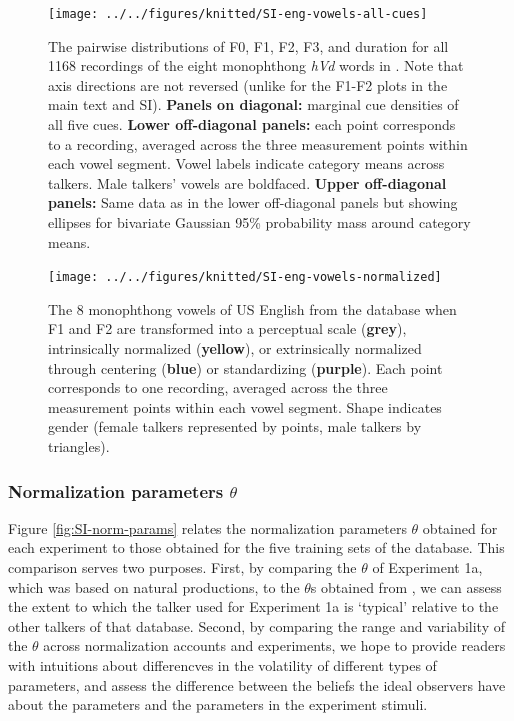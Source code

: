 \documentclass[preprint]{JASA}
\begin{document}
\begin{figure}[!ht]

{\centering \texttt{[image: ../../figures/knitted/SI-eng-vowels-all-cues]} 

}

\caption{The pairwise distributions of F0, F1, F2, F3, and duration for all 1168 recordings of the eight monophthong \emph{hVd} words in \citet{xie-jaeger2020}. Note that axis directions are not reversed (unlike for the F1-F2 plots in the main text and SI). \textbf{Panels on diagonal:} marginal cue densities of all five cues. \textbf{Lower off-diagonal panels:} each point corresponds to a recording, averaged across the three measurement points within each vowel segment. Vowel labels indicate category means across talkers. Male talkers' vowels are boldfaced. \textbf{Upper off-diagonal panels:} Same data as in the lower off-diagonal panels but showing ellipses for bivariate Gaussian 95\% probability mass around category means.}\label{fig:SI-eng-vowels-all-cues}
\end{figure}



\begin{figure}

{\centering \texttt{[image: ../../figures/knitted/SI-eng-vowels-normalized]} 

}

\caption{The 8 monophthong vowels of US English from the \citet{xie-jaeger2020} database when F1 and F2 are transformed into a perceptual scale (\textbf{grey}), intrinsically normalized (\textbf{yellow}), or extrinsically normalized through centering (\textbf{blue}) or standardizing (\textbf{purple}). Each point corresponds to one recording, averaged across the three measurement points within each vowel segment. Shape indicates gender (female talkers represented by points, male talkers by triangles).}\label{fig:SI-eng-vowels-normalized}
\end{figure}

\subsubsection{\texorpdfstring{Normalization parameters \(\theta\)}{Normalization parameters \textbackslash theta}}\label{sec:SI-norm-params}

Figure \ref{fig:SI-norm-params} relates the normalization parameters \(\theta\) obtained for each experiment to those obtained for the five training sets of the \citet{xie-jaeger2020} database. This comparison serves two purposes. First, by comparing the \(\theta\) of Experiment 1a, which was based on natural productions, to the \(\theta\)s obtained from \citet{xie-jaeger2020}, we can assess the extent to which the talker used for Experiment 1a is `typical' relative to the other talkers of that database. Second, by comparing the range and variability of the \(\theta\) across normalization accounts and experiments, we hope to provide readers with intuitions about differencves in the volatility of different types of parameters, and assess the difference between the beliefs the ideal observers have about the parameters and the parameters in the experiment stimuli.
\end{document}
